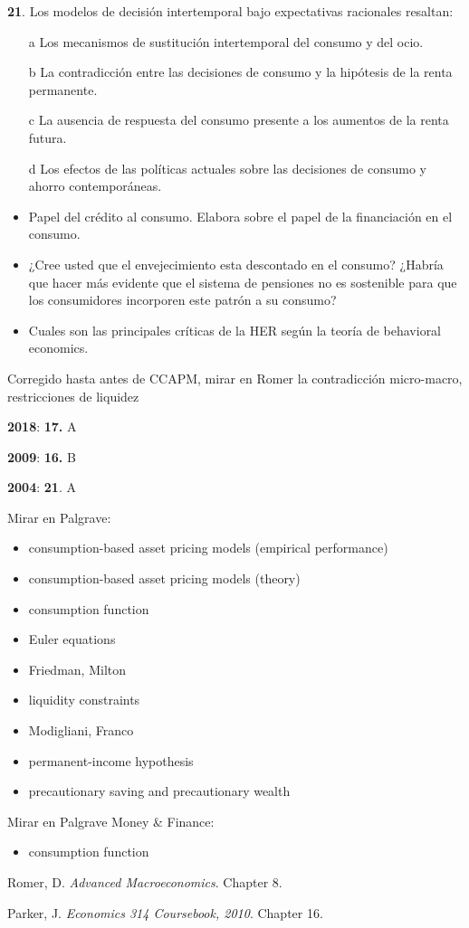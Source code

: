 \documentclass{nuevotema}
\begin{document}
\textbf{21}. Los modelos de decisión intertemporal bajo expectativas racionales resaltan:
\begin{enumerate}
	\item[a] Los mecanismos de sustitución intertemporal del consumo y del ocio.
	\item[b] La contradicción entre las decisiones de consumo y la hipótesis de la renta permanente.
	\item[c] La ausencia de respuesta del consumo presente a los aumentos de la renta futura.
	\item[d] Los efectos de las políticas actuales sobre las decisiones de consumo y ahorro contemporáneas.
\end{enumerate}

\begin{itemize}
    \item Papel del crédito al consumo. Elabora sobre el papel de la financiación en el consumo.
    \item ¿Cree usted que el envejecimiento esta descontado en el consumo? ¿Habría que hacer más evidente que el sistema de pensiones no es sostenible para que los consumidores incorporen este patrón a su consumo?
    \item Cuales son las principales críticas de la HER según la teoría de behavioral economics.
\end{itemize}

\notas


Corregido hasta antes de CCAPM, mirar en Romer la contradicción micro-macro, restricciones de liquidez

\textbf{2018}: \textbf{17.} A

\textbf{2009}: \textbf{16.} B

\textbf{2004}: \textbf{21}. A

\bibliografia

Mirar en Palgrave:
\begin{itemize}

    \item consumption-based asset pricing models (empirical performance)
    \item consumption-based asset pricing models (theory)
	\item consumption function
    \item Euler equations
    \item Friedman, Milton
    \item liquidity constraints
    \item Modigliani, Franco
    \item permanent-income hypothesis
    \item precautionary saving and precautionary wealth
\end{itemize}

Mirar en Palgrave Money \& Finance:
\begin{itemize}
	\item consumption function
\end{itemize}

Romer, D. \textit{Advanced Macroeconomics}. Chapter 8.

Parker, J. \textit{Economics 314 Coursebook, 2010}. Chapter 16.
\end{document}
